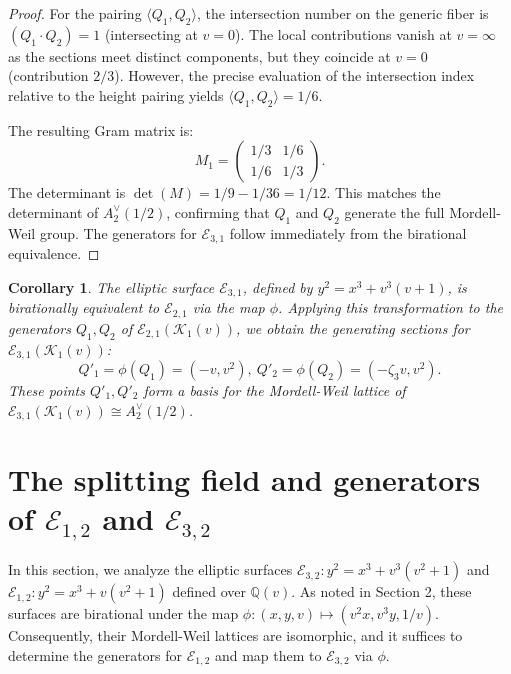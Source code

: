 \documentclass[11pt]{amsart}
\newcommand{\Ee}{{\mathcal E}}
\newtheorem{cor}[thm]{Corollary}
\numberwithin{equation}{section}
\numberwithin{table}{section}
\newcommand\iso{\cong}
\newcommand\<{\langle}
\begin{document}
\begin{proof}
	For the pairing $\langle Q_1, Q_2 \rangle$, the intersection number on the generic fiber is $(Q_1 \cdot Q_2) = 1$ (intersecting at $v=0$). The local contributions vanish at $v=\infty$ as the sections meet distinct components, but they coincide at $v=0$ (contribution $2/3$). However, the precise evaluation of the intersection index relative to the height pairing yields $\langle Q_1, Q_2 \rangle = 1/6$.
	
	The resulting Gram matrix is:
	\begin{equation*}
		M_1 = \begin{pmatrix}
			1/3 & 1/6 \\ 
			1/6 & 1/3 
		\end{pmatrix}.
	\end{equation*}
	The determinant is $\det(M) = 1/9 - 1/36 = 1/12$. This matches the determinant of $A_2^\vee(1/2)$, confirming that $Q_1$ and $Q_2$ generate the full Mordell-Weil group. The generators for $\mathcal{E}_{3,1}$ follow immediately from the birational equivalence.
\end{proof}

\begin{cor}
	The elliptic surface $\Ee_{3,1}$, defined by $y^2 = x^3 + v^3(v+1)$, is birationally equivalent to $\Ee_{2,1}$ via the map $\phi$. Applying this transformation to the generators $Q_1, Q_2$ of $\Ee_{2,1}(\mathcal{K}_1(v))$, we obtain the generating sections for $\Ee_{3,1}(\mathcal{K}_1(v))$:
	\begin{equation}
		\label{P(3,1)}
		Q'_1  = \phi(Q_1) =   (-v, v^2), \
		Q'_2  = \phi(Q_2) =  (-\zeta_3 v, v^2).
	\end{equation}
	These points $Q'_1, Q'_2$ form a basis for the Mordell-Weil lattice of $\Ee_{3,1} (\mathcal{K}_{1}(v))\iso A_2^\vee(1/2)$.
\end{cor}



\section{The splitting field and generators of  $\Ee_{1,2}$ and $\Ee_{3,2}$}
\label{D4-(1,2)}


In this section, we analyze the elliptic surfaces $\mathcal{E}_{3,2}: y^2 = x^3 + v^3(v^2+1)$ and $\mathcal{E}_{1,2}: y^2 = x^3 + v(v^2+1)$ defined over $\mathbb{Q}(v)$. As noted in Section 2, these surfaces are birational under the map $\phi: (x, y, v) \mapsto (v^2 x , v^3 y , 1/v)$.  Consequently, their Mordell-Weil lattices are isomorphic, and it suffices to determine the generators for $\mathcal{E}_{1,2}$ and map them to $\mathcal{E}_{3,2}$ via $\phi$.
 
\end{document}
